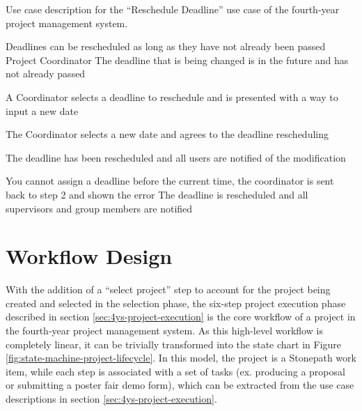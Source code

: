 \documentclass[document.tex]{subfiles}
\begin{document}
\begin{table}
  \centering
  \caption{Use case description for the ``Reschedule Deadline'' use case of the fourth-year project management system.}
  \label{tbl:use-case-reschedule-deadline}

  \begin{usecase}
    Deadlines can be rescheduled as long as they have not already been passed
    Project Coordinator
    The deadline that is being changed is in the future and has not already passed
    \ucnormal
    \begin{ucenum}
      \item A Coordinator selects a deadline to reschedule and is presented with a way to input a new date
      \item The Coordinator selects a new date and agrees to the deadline rescheduling
      \item The deadline has been rescheduled and all users are notified of the modification
    \end{ucenum}
    You cannot assign a deadline before the current time, the coordinator is sent back to step 2 and shown the error
    The deadline is rescheduled and all supervisors and group members are notified
  \end{usecase}
\end{table}


\FloatBarrier

\section{Workflow Design}
\label{sec:4ys-workflow-design}

With the addition of a ``select  project'' step to account for the project being created and selected in the selection phase, the six-step project execution phase described in section \ref{sec:4ys-project-execution} is the core workflow of a project in the fourth-year project management system. As this high-level workflow is completely linear, it can be trivially transformed into the state chart in Figure \ref{fig:state-machine-project-lifecycle}. In this model, the project is a Stonepath work item, while each step is associated with a set of tasks (ex. producing a proposal or submitting a poster fair demo form), which can be extracted from the use case descriptions in section \ref{sec:4ys-project-execution}.
\end{document}
